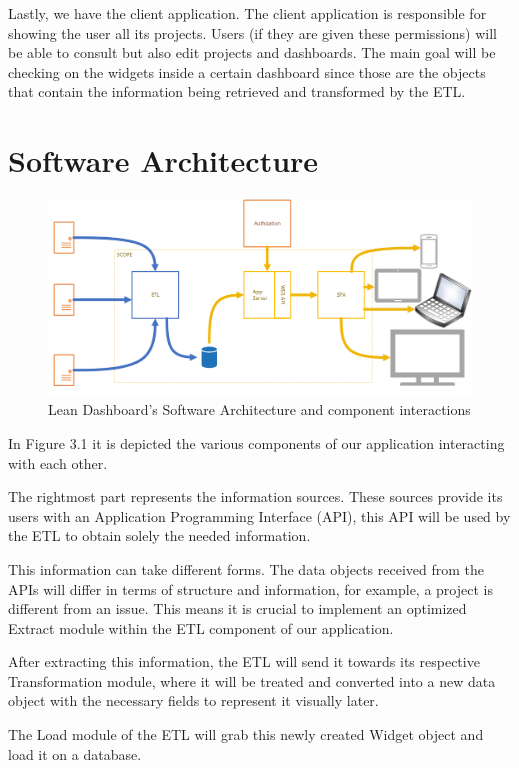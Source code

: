 \documentclass[a4paper,twoside,10pt]{report}
\begin{document}
Lastly, we have the client application. The client application is responsible for showing the user all its projects. Users (if they are given these permissions) will be able to consult but also edit projects and dashboards. The main goal will be checking on the widgets inside a certain dashboard since those are the objects that contain the information being retrieved and transformed by the ETL.

\section{Software Architecture}

\begin{figure}[h!]
\center
  \includegraphics[width=\textwidth]{lean-dashboard-software-architecture.png}
  \caption{Lean Dashboard's Software Architecture and component interactions}
\end{figure}
In Figure 3.1 it is depicted the various components of our application interacting with each other.

The rightmost part represents the information sources. These sources provide its users with an Application Programming Interface (API), this API will be used by the ETL to obtain solely the needed information.

This information can take different forms. The data objects received from the APIs will differ in terms of structure and information, for example, a project is different from an issue. This means it is crucial to implement an optimized Extract module within the ETL component of our application.

After extracting this information, the ETL will send it towards its respective Transformation module, where it will be treated and converted into a new data object with the necessary fields to represent it visually later.

The Load module of the ETL will grab this newly created Widget object and load it on a database.
\end{document}
